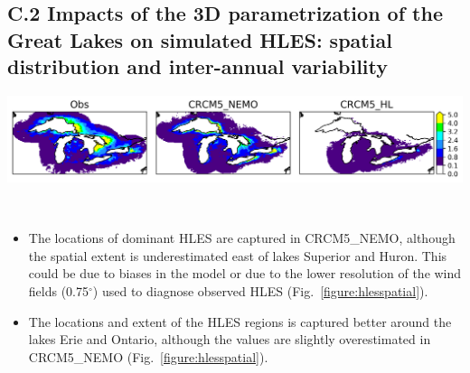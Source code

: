 \documentclass[a0b,landscape]{a0poster}
\begin{document}
\begin{multicols*}{4}
\subsection*{C.2 Impacts of the 3D parametrization of the Great Lakes on simulated HLES: spatial distribution and inter-annual variability}
\noindent
\begin{minipage}{\linewidth}
  \center
  \includegraphics[width=\linewidth]{figures/hles_clim_NDJ}
\end{minipage} \\[0.15cm]


\begin{itemize}
  \item The locations of dominant HLES are captured in CRCM5\_NEMO, although the spatial extent is underestimated east of lakes Superior and Huron.
        This could be due to biases in the model or due to the lower resolution of the wind fields (0.75$^\circ$) used to diagnose observed HLES (Fig.~\ref{figure:hlesspatial}).
  \item The locations and extent of the HLES regions is captured better around the lakes Erie and Ontario, although the values are slightly overestimated in
        CRCM5\_NEMO (Fig.~\ref{figure:hlesspatial}).
\end{itemize}


\end{multicols*}
\end{document}
